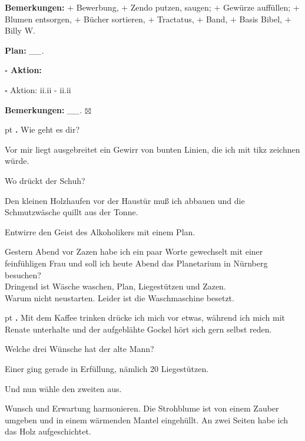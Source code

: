 \documentclass[10pt,a4paper]{article}
\newcounter{notec}
\newcommand\notep[1]{%
  \stepcounter{notec}
  \vskip #1pt
  {\bf\arabic{notec}.}
}
\newcommand\prop[1] {{\color {alizarin} {\bf #1}}}             %
\newcommand\mand[1] {{\color {burntorange} {\bf #1}}}          %
\newcommand\topspace{\vskip -15pt \hskip 20pt}
\newcommand\bottomspace{\vskip 4pt}
\newcommand\n[1] { {\sl #1.} \hskip 5pt }
\begin{document}
\begin{mdframed}[style=daystyle]
\begin{labeling}{{\mand {Bemerkungen:}}}
    $+$ Bewerbung,
    $+$ Zendo putzen, saugen; $+$ Gewürze auffüllen; $+$ Blumen entsorgen, $+$ Bücher sortieren,
    $+$ Tractatus, $+$ Band, $+$ Basis Bibel, $+$ Billy W.  
  \item[{\mand {Plan:}}]         \n{\_\_}
    \topspace
    \begin{minipage}{0.75\textwidth}  
      \begin{labeling}{\prop {$\square$ {Aktion:}}} 
        \setlength\itemsep{-3pt}
      \item[$\square$ Aktion:]  ii.ii - ii.ii
      \end{labeling}
    \end{minipage}
    \bottomspace
  \item[{\mand {Bemerkungen:}}]  \n{\_\_} $\boxtimes$
  \end{labeling}
    
  \setcounter{notec}{0}
  
  \notep 0 Wie geht es dir?

  \vskip 2pt
  Vor mir liegt ausgebreitet ein Gewirr von bunten Linien, die ich mit tikz
  zeichnen würde.

  \vskip 2pt
  Wo drückt der Schuh?

  \vskip 2pt
  Den kleinen Holzhaufen vor der Haustür muß ich abbauen und die Schmutzwäsche
  quillt aus der Tonne.

  \vskip 2pt
  Entwirre den Geist des Alkoholikers mit einem Plan.

  \vskip 2pt
  Gestern Abend vor Zazen habe ich ein paar Worte gewechselt mit einer
  feinfühligen Frau und soll ich heute Abend das Planetarium in Nürnberg
  besuchen? \\
  Dringend ist Wäsche waschen, Plan, Liegestützen und Zazen. \\
  Warum nicht neustarten. Leider ist die Waschmaschine besetzt.

  \notep 4 Mit dem Kaffee trinken drücke ich mich vor etwas, während ich mich mit
  Renate unterhalte und der aufgeblähte Gockel hört sich gern selbst reden.

  \vskip 2pt
  Welche drei Wünsche hat der alte Mann?

  \vskip 2pt
  Einer ging gerade in Erfüllung, nämlich 20 Liegestützen.

  \vskip 2pt
  Und nun wähle den zweiten aus.

  \vskip 2pt
  Wunsch und Erwartung harmonieren. Die Strohblume ist von einem Zauber umgeben
  und in einem wärmenden Mantel eingehüllt. An zwei Seiten habe ich das Holz
  aufgeschichtet.


\end{mdframed}
\end{document}
